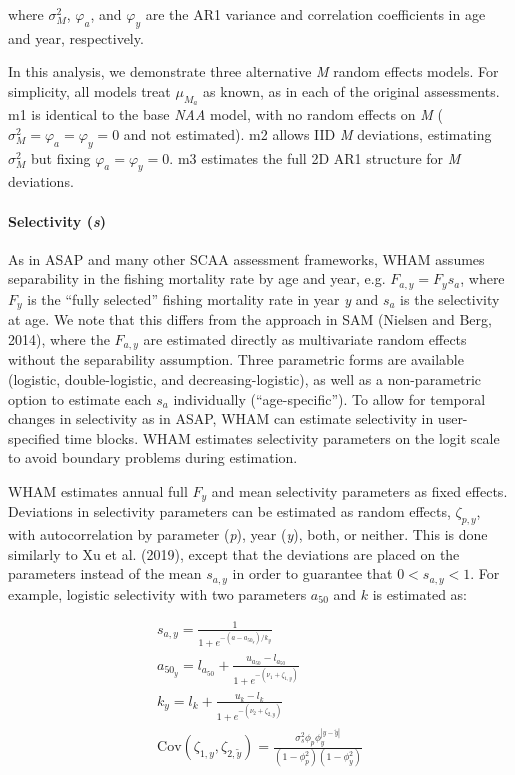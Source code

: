 \documentclass[]{article}
\let\oldparagraph\paragraph
\renewcommand{\paragraph}[1]{\oldparagraph{#1}\mbox{}}
\begin{document}
where \(\sigma^2_M\), \(\varphi_a\), and \(\varphi_y\) are the AR1
variance and correlation coefficients in age and year, respectively.

In this analysis, we demonstrate three alternative \emph{M} random
effects models. For simplicity, all models treat \(\mu_{M_a}\) as known,
as in each of the original assessments. m1 is identical to the base
\emph{NAA} model, with no random effects on \emph{M}
(\(\sigma^2_M = \varphi_a = \varphi_y = 0\) and not estimated). m2
allows IID \emph{M} deviations, estimating \(\sigma^2_M\) but fixing
\(\varphi_a = \varphi_y = 0\). m3 estimates the full 2D AR1 structure
for \emph{M} deviations.

\hypertarget{selectivity-s}{%
\paragraph{\texorpdfstring{Selectivity
(\emph{s})}{Selectivity (s)}}\label{selectivity-s}}

As in ASAP and many other SCAA assessment frameworks, WHAM assumes
separability in the fishing mortality rate by age and year, e.g.
\(F_{a,y} = F_y s_a\), where \(F_y\) is the ``fully selected'' fishing
mortality rate in year \emph{y} and \(s_a\) is the selectivity at age.
We note that this differs from the approach in SAM (Nielsen and Berg,
2014), where the \(F_{a,y}\) are estimated directly as multivariate
random effects without the separability assumption. Three parametric
forms are available (logistic, double-logistic, and
decreasing-logistic), as well as a non-parametric option to estimate
each \(s_a\) individually (``age-specific''). To allow for temporal
changes in selectivity as in ASAP, WHAM can estimate selectivity in
user-specified time blocks. WHAM estimates selectivity parameters on the
logit scale to avoid boundary problems during estimation.

WHAM estimates annual full \(F_y\) and mean selectivity parameters as
fixed effects. Deviations in selectivity parameters can be estimated as
random effects, \(\zeta_{p,y}\), with autocorrelation by parameter
(\emph{p}), year (\emph{y}), both, or neither. This is done similarly to
Xu et al. (2019), except that the deviations are placed on the
parameters instead of the mean \(s_{a,y}\) in order to guarantee that
\(0 < s_{a,y} < 1\). For example, logistic selectivity with two
parameters \(a_{50}\) and \(k\) is estimated as:

\begin{equation}
  \begin{array}{cccc}
    s_{a,y} = \frac{1}{1 + e^{-(a - a_{{50}_y}) / k_y}} \\
    a_{{50}_y} = l_{a_{50}} + \frac{u_{a_{50}} - l_{a_{50}}}{1 + e^{-(\nu_1 + \zeta_{1,y})}} \\
    k_y = l_k + \frac{u_k - l_k}{1 + e^{-(\nu_2 + \zeta_{2,y})}} \\
    \text{Cov} \left( \zeta_{1,y}, \zeta_{2,\tilde{y}} \right) = \frac{\sigma^2_s \phi_p \phi^{|y-\tilde{y}|}_{y}}{\left(1-\phi^2_{p}\right) \left(1-\phi^2_{y}\right)}
  \end{array}
\end{equation}
\end{document}
